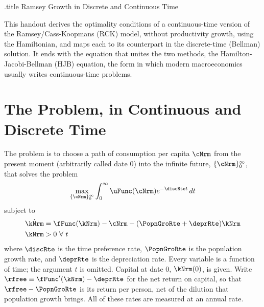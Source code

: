 \documentclass{econark}
\begin{document}
\handoutHeader

\begin{verbatimwrite}{\jobname.title}
  Ramsey Growth in Discrete and Continuous Time
\end{verbatimwrite}

\handoutNameMake

This handout derives the optimality conditions of a continuous-time version of the Ramsey/Cass-Koopmans (RCK) model, without productivity growth, using the Hamiltonian, and maps each to its counterpart in the discrete-time (Bellman) solution. It ends with the equation that unites the two methods, the Hamilton-Jacobi-Bellman (HJB) equation, the form in which modern macroeconomics usually writes continuous-time problems.

\section{The Problem, in Continuous and Discrete Time}

The problem is to choose a path of consumption per capita $\cNrm$ from the present moment (arbitrarily called date 0) into the infinite future, $\{\cNrm\}_{0}^{\infty}$, that solves the problem
\begin{equation}
  \max_{\{\cNrm\}_{0}^{\infty}} \int_{0}^{\infty} \uFunc(\cNrm) e^{-\discRte t}\,dt \label{eq:HVD-maxprob}
\end{equation}
subject to
\begin{equation*}\begin{gathered}\begin{aligned}
        \dot{\kNrm} & =  \fFunc(\kNrm) - \cNrm - (\PopnGroRte+\deprRte)\kNrm
\\      \kNrm & >  0 ~\forall~t
\end{aligned}\end{gathered}\end{equation*}
where $\discRte$ is the time preference rate, $\PopnGroRte$ is the population growth rate, and $\deprRte$ is the depreciation rate. Every variable is a function of time; the argument $t$ is omitted. Capital at date 0, $\kNrm(0)$, is given. Write $\rfree \equiv \fFunc^{\prime}(\kNrm)-\deprRte$ for the net return on capital, so that $\rfree-\PopnGroRte$ is its return per person, net of the dilution that population growth brings. All of these rates are measured at an annual rate.
\end{document}
